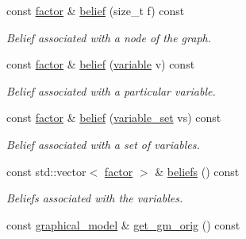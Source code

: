 \begin{DoxyCompactItemize}
const \hyperlink{classmerlin_1_1factor}{factor} \& \hyperlink{classmerlin_1_1ijgp_a43ba4b5f66a27881b8b6d4a0fed23b3f}{belief} (size\+\_\+t f) const 
\begin{DoxyCompactList}\small\item\em Belief associated with a node of the graph. \end{DoxyCompactList}\item 
const \hyperlink{classmerlin_1_1factor}{factor} \& \hyperlink{classmerlin_1_1ijgp_a950771f418c3fa8980e449c1b081a9cc}{belief} (\hyperlink{classmerlin_1_1variable}{variable} v) const 
\begin{DoxyCompactList}\small\item\em Belief associated with a particular variable. \end{DoxyCompactList}\item 
const \hyperlink{classmerlin_1_1factor}{factor} \& \hyperlink{classmerlin_1_1ijgp_a5506025b0268f56419a472d674faa476}{belief} (\hyperlink{classmerlin_1_1variable__set}{variable\+\_\+set} vs) const 
\begin{DoxyCompactList}\small\item\em Belief associated with a set of variables. \end{DoxyCompactList}\item 
const std\+::vector$<$ \hyperlink{classmerlin_1_1factor}{factor} $>$ \& \hyperlink{classmerlin_1_1ijgp_a031930b83efb5b52a5af5387a18ee0e2}{beliefs} () const 
\begin{DoxyCompactList}\small\item\em Beliefs associated with the variables. \end{DoxyCompactList}\item 
\hypertarget{classmerlin_1_1ijgp_ac71678e2b148ae0d6b854e07505107fd}{}const \hyperlink{classmerlin_1_1graphical__model}{graphical\+\_\+model} \& \hyperlink{classmerlin_1_1ijgp_ac71678e2b148ae0d6b854e07505107fd}{get\+\_\+gm\+\_\+orig} () const \label{classmerlin_1_1ijgp_ac71678e2b148ae0d6b854e07505107fd}


\end{DoxyCompactItemize}
